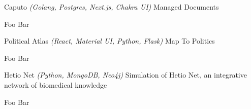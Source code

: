

\begin{cventries}

  \cventryproject
    {Caputo} %
    {\emph{(Golang, Postgres, Next.js, Chakra UI)}}
    {} %
    {Managed Documents} %
    {
      \begin{cvitems} %
        \item {Foo Bar}
      \end{cvitems}
    }

\cventryproject
    {Political Atlas} %
    {\emph{(React, Material UI, Python, Flask)}}
    {} %
    {Map To Politics } %
    {
      \begin{cvitems} %
        \item {Foo Bar}
      \end{cvitems}
    }

\cventryproject
    {Hetio Net} %
    {\emph{(Python, MongoDB, Neo4j)}}
    {} %
    {Simulation of Hetio Net, an integrative network of biomedical knowledge} %
    {
      \begin{cvitems} %
        \item {Foo Bar}
      \end{cvitems}
    }
\end{cventries}
